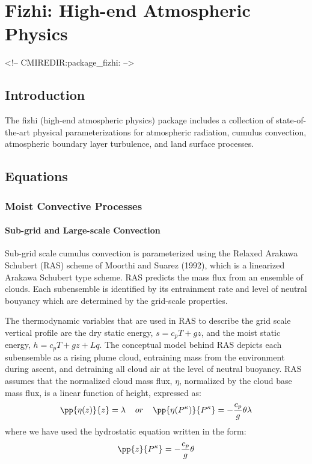 \section{Fizhi: High-end Atmospheric Physics}
\label{sec:pkg:fizhi}
\begin{rawhtml}
<!-- CMIREDIR:package_fizhi: -->
\end{rawhtml}


\subsection{Introduction}
The fizhi (high-end atmospheric physics) package includes a collection of state-of-the-art
physical parameterizations for atmospheric radiation, cumulus convection, atmospheric
boundary layer turbulence, and land surface processes.

 
\subsection{Equations}

\subsubsection{Moist Convective Processes}

\paragraph{Sub-grid and Large-scale Convection}
\label{sec:fizhi:mc}

Sub-grid scale cumulus convection is parameterized using the Relaxed Arakawa
Schubert (RAS) scheme of Moorthi and Suarez (1992), which is a linearized Arakawa Schubert
type scheme.  RAS predicts the mass flux from an ensemble of clouds.  Each subensemble is identified
by its entrainment rate and level of neutral bouyancy which are determined by the grid-scale properties.

The thermodynamic variables that are used in RAS to describe the grid scale vertical profile are
the dry static energy, $s=c_pT +gz$, and the moist static energy, $h=c_p T + gz + Lq$. 
The conceptual model behind RAS depicts each subensemble as a rising plume cloud, entraining 
mass from the environment during ascent, and detraining all cloud air at the level of neutral 
buoyancy. RAS assumes that the normalized cloud mass flux, $\eta$, normalized by the cloud base 
mass flux, is a linear function of height, expressed as:
\[
\pp{\eta(z)}{z} = \lambda \hspace{0.4cm}or\hspace{0.4cm} \pp{\eta(P^{\kappa})}{P^{\kappa}} = 
-{c_p \over {g}}\theta\lambda
\]
where we have used the hydrostatic equation written in the form:
\[
\pp{z}{P^{\kappa}} = -{c_p \over {g}}\theta
\]

